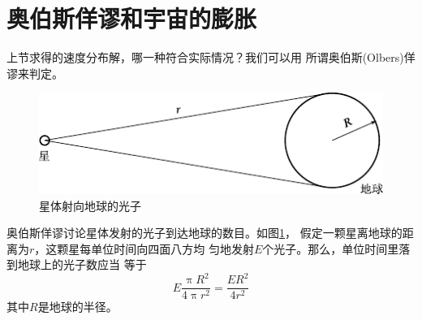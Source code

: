 \section{奥伯斯佯谬和宇宙的膨胀}\label{sec:05.04}

上节求得的速度分布解，哪一种符合实际情况？我们可以用
所谓奥伯斯(Olbers)佯谬来判定。
\begin{figure}[h]
  \centering
  \includegraphics{figure/fig05.02}
  \caption{星体射向地球的光子}
  \label{fig:05.02}
\end{figure}

奥伯斯佯谬讨论星体发射的光子到达地球的数目。如图\ref{fig:05.02}，
假定一颗星离地球的距离为$ r $，这颗星每单位时间向四面八方均
匀地发射$ E $个光子。那么，单位时间里落到地球上的光子数应当
等于
\begin{equation}\label{eqn:05.04.01}
  E \frac { \uppi R ^ { 2 } } { 4 \uppi r ^ { 2 } } = \frac { E R ^ { 2 } } { 4 r ^ { 2 } }
\end{equation}
其中$ R $是地球的半径。

